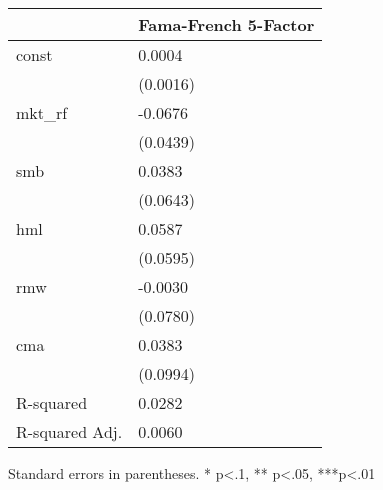 \begin{table}
\caption{}
\label{}
\begin{center}
\begin{tabular}{ll}
\hline
               & Fama-French 5-Factor  \\
\hline
const          & 0.0004                \\
               & (0.0016)              \\
mkt\_rf        & -0.0676               \\
               & (0.0439)              \\
smb            & 0.0383                \\
               & (0.0643)              \\
hml            & 0.0587                \\
               & (0.0595)              \\
rmw            & -0.0030               \\
               & (0.0780)              \\
cma            & 0.0383                \\
               & (0.0994)              \\
R-squared      & 0.0282                \\
R-squared Adj. & 0.0060                \\
\hline
\end{tabular}
\end{center}
\end{table}
\bigskip
Standard errors in parentheses. \newline 
* p<.1, ** p<.05, ***p<.01